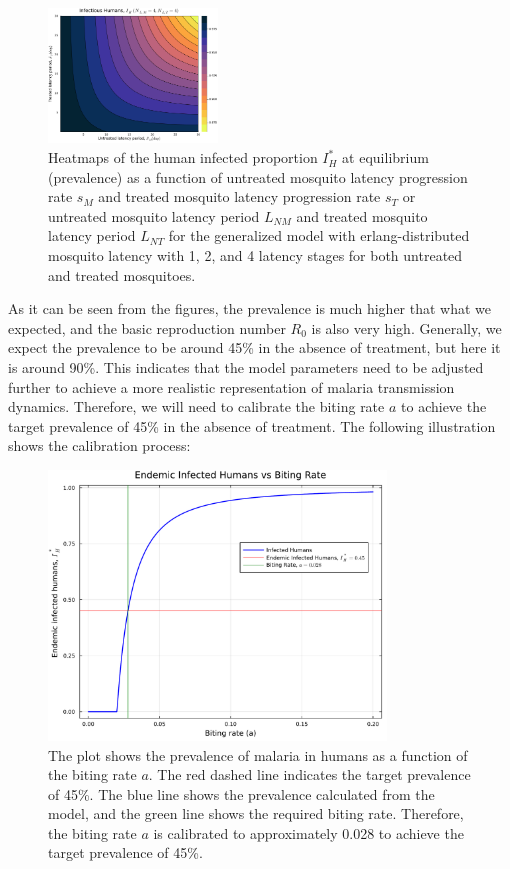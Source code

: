 \documentclass[11pt]{article}
\begin{document}
\begin{figure}[H]
  \includegraphics[width=0.4\textwidth]{../../fig/Ih_periods_SMxST_4x4_uncal.pdf}
  \caption{Heatmaps of the human infected proportion $I_H^*$ at equilibrium (prevalence) as a function of untreated mosquito latency progression rate $s_M$ and treated mosquito latency progression rate $s_T$ or untreated mosquito latency period $L_{NM}$ and treated mosquito latency period $L_{NT}$ for the generalized model with erlang-distributed mosquito latency with 1, 2, and 4 latency stages for both untreated and treated mosquitoes.}
\end{figure}

As it can be seen from the figures, the prevalence is much higher that what we expected, and the basic reproduction number $R_0$ is also very high. Generally, we expect the prevalence to be around 45\% in the absence of treatment, but here it is around 90\%. This indicates that the model parameters need to be adjusted further to achieve a more realistic representation of malaria transmission dynamics. Therefore, we will need to calibrate the biting rate $a$ to achieve the target prevalence of 45\% in the absence of treatment. The following illustration shows the calibration process:

\begin{figure}[H]
  \centering
  \includegraphics[width=0.8\textwidth]{../../fig/a_cal_PLT.pdf}
  \caption{The plot shows the prevalence of malaria in humans as a function of the biting rate $a$. The red dashed line indicates the target prevalence of 45\%. The blue line shows the prevalence calculated from the model, and the green line shows the required biting rate. Therefore, the biting rate $a$ is calibrated to approximately 0.028 to achieve the target prevalence of 45\%.}
\end{figure}
\end{document}
